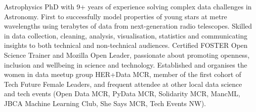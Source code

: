  \vspace{-6pt}

\begin{cvpubs}
  \cvpub
    {
      \begin{cvlist}
  \item {Astrophysics PhD with 9+ years of experience solving complex data challenges in Astronomy. First to successfully model properties of young stars at metre wavelengths using terabytes of data from next-generation radio telescopes. Skilled in data collection, cleaning, analysis, visualisation, statistics and communicating insights to both technical and non-technical audiences. Certified FOSTER Open Science Trainer and Mozilla Open Leader, passionate about promoting openness, inclusion and wellbeing in science and technology. Established and organises the women in data meetup group HER+Data MCR, member of the first cohort of Tech Future Female Leaders, and frequent attendee at other local data science and tech events (Open Data MCR, PyData MCR, Solidarity MCR, MancML, JBCA Machine Learning Club, She Says MCR, Tech Events NW).}
      \end{cvlist}
    }
\vspace{-11pt}
\end{cvpubs}


